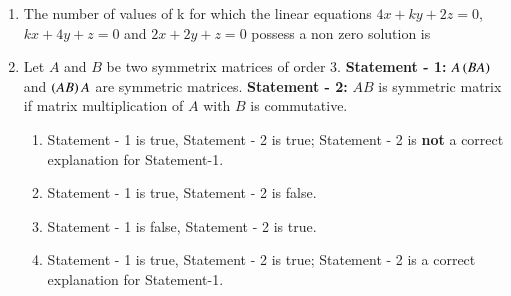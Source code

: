 \documentclass[journal,12pt,twocolumn]{IEEEtran}
\theoremstyle{remark}
\begin{document}
\begin{enumerate}
    \item The number of values of k for which the linear equations $4x + ky + 2z = 0$, $kx + 4y + z = 0$ and $2x + 2y + z=0$ possess a non zero solution is 
	\hfill {}{\par}
        \begin{enumerate}
        \end{enumerate}

    \item Let $A$ and $B$ be two symmetrix matrices of order $3$.
	\newline
	\textbf{Statement - 1:} $A\left(BA\right)$ and $\left(AB\right)A$ are symmetric matrices. 
	\newline
	\textbf{Statement - 2:} $AB$ is symmetric matrix if matrix multiplication of $A$ with $B$ is commutative.

	\begin{enumerate}
		\item Statement - 1 is true, Statement - 2 is true; Statement - 2 is \textbf{not} a correct explanation for Statement-1. 
	    	\item Statement - 1 is true, Statement - 2 is false. 
	    	\item Statement - 1 is false, Statement - 2 is true.
	    	\item Statement - 1 is true, Statement - 2 is true; Statement - 2 is a correct explanation for Statement-1. 
	\end{enumerate}


\end{enumerate}
\end{document}
